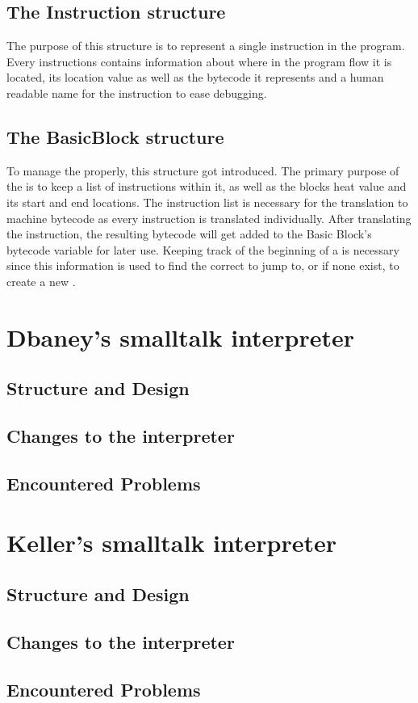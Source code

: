\subsection{The Instruction structure}
The purpose of this structure is to represent a single instruction in the program. Every instructions contains information about where in the program flow it is located, its location value as well as the bytecode it represents and a human readable name for the instruction to ease debugging.

\subsection{The BasicBlock structure}
To manage the \bbs{} properly, this structure got introduced.
The primary purpose of the \bb{} is to keep a list of instructions within it, as well as the blocks heat value and its start and end locations. 
The instruction list is necessary for the translation to machine bytecode as every instruction is translated individually. After translating the instruction, the resulting bytecode will get added to the Basic Block's bytecode variable for later use. 
Keeping track of the beginning of a \bb{} is necessary since this information is used to find the correct \bb{} to jump to, or if none exist, to create a new \bb{}.

\section{Dbaney's smalltalk interpreter}
\subsection{Structure and Design}
\subsection{Changes to the interpreter}
\subsection{Encountered Problems}


\section{Keller's smalltalk interpreter}
\subsection{Structure and Design}
\subsection{Changes to the interpreter}
\subsection{Encountered Problems}


